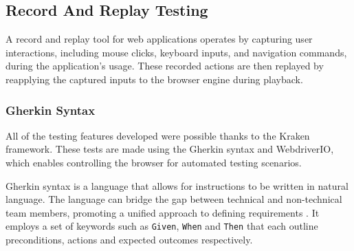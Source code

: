 \subsection{Record And Replay Testing}

A record and replay tool for web applications operates by capturing user interactions, including mouse clicks, keyboard inputs, and navigation commands, during the application's usage. These recorded actions are then replayed by reapplying the captured inputs to the browser engine during playback. \citep{inproc:recordreplay-2016}

\subsubsection{Gherkin Syntax}

All of the testing features developed were possible thanks to the Kraken framework. These tests are made using the Gherkin syntax and WebdriverIO, which enables controlling the browser for automated testing scenarios. \citep{art:kraken-2023}

Gherkin syntax is a language that allows for instructions to be written in natural language. The language can bridge the gap between technical and non-technical team members, promoting a unified approach to defining requirements \citep{misc:cucumber-gherkin-2023}. It employs a set of keywords such as \verb|Given|, \verb|When| and \verb|Then| that each outline preconditions, actions and expected outcomes respectively.


